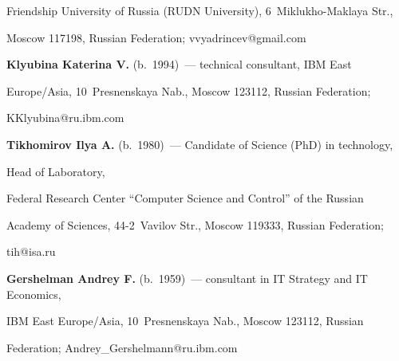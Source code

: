 Friendship University of Russia (RUDN University), 6~Miklukho-Maklaya Str., 

Moscow 117198, Russian Federation; \mbox{vvyadrincev@gmail.com}



\vspace*{3pt}



\noindent

\textbf{Klyubina Katerina V.} (b.\ 1994)~--- technical consultant, IBM East 

Europe\!/\!Asia, 10~Presnenskaya Nab., Moscow 123112, Russian Federation; 

\mbox{KKlyubina@ru.ibm.com}



\vspace*{3pt}



\noindent

\textbf{Tikhomirov Ilya A.} (b.\ 1980)~--- Candidate of Science (PhD) in technology, 

Head of Laboratory, 

Federal Research Center ``Computer Science and Control'' of the Russian 

Academy of Sciences, 44-2~Vavilov Str., Moscow 119333, Russian Federation; 

\mbox{tih@isa.ru}



\vspace*{3pt}



\noindent

\textbf{Gershelman Andrey F.} (b.\ 1959)~--- consultant in IT Strategy and IT Economics, 

IBM East Europe\!/\!Asia, 10~Presnenskaya Nab., Moscow 123112, Russian 

Federation;  \mbox{Andrey\_Gershelmann@ru.ibm.com}



\label{end\stat}





\renewcommand{\bibname}{\protect\rm Литература}

